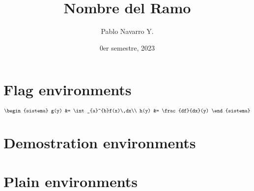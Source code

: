 \documentclass[toc]{apuntes}
\title{Nombre del Ramo}
\author{Pablo Navarro Y.}
\date{0er semestre, 2023}
\begin{document}
\renewcommand{\onlyinsubfile}[1]{}
\renewcommand{\notinsubfile}[1]{#1}
\maketitle

\section{Flag environments}
\begin{definicion}[][reff]
  \begin{equation}
    \begin{sistema}
      g(y) &= \int_{a}^{b}f(x)\,dx\\
      h(y) &= \frac{df}{dx}(y)
    \end{sistema}
  \end{equation}
  \lipsum[1]
\end{definicion}

\begin{prop}[][reff]
  \lipsum[1]
\end{prop}

\begin{teorema}[][reff]
  \lipsum[1]
\end{teorema}

\begin{corolario}[][reff]
  \lipsum[1]
\end{corolario}

\begin{lema}[][reff]
  \lipsum[1]
\end{lema}

\section{Demostration environments}

\begin{dem}[]
  \lipsum[1]
\end{dem}

\begin{sol}[]
  \lipsum[1]
\end{sol}

\section{Plain environments}

\begin{aff}[]
  \lipsum[1]
\end{aff}
\end{document}
